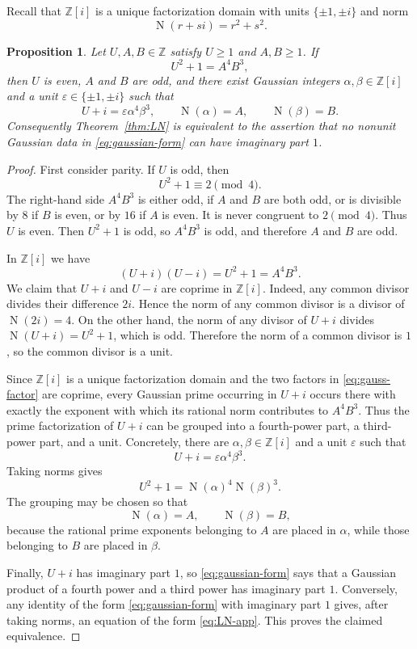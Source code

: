 \documentclass[a4paper,11pt]{amsart}
\newtheorem{proposition}[theorem]{Proposition}
\theoremstyle{remark}
\DeclareMathOperator{\Norm}{N}
\newcommand{\Z}{\mathbb Z}
\newcommand{\Zi}{\mathbb Z[i]}
\begin{document}
Recall that $\Zi$ is a unique factorization domain with units
$\{\pm1,\pm i\}$ and norm
\[
        \Norm(r+si)=r^2+s^2.
\]

\begin{proposition}\label{prop:gaussian-reformulation}
Let $U,A,B\in\Z$ satisfy $U\geq1$ and $A,B\geq1$.  If
\[
        U^2+1=A^4B^3,                         \tag{A.1}\label{eq:LN-app}
\]
then $U$ is even, $A$ and $B$ are odd, and there exist Gaussian integers
$\alpha,\beta\in\Zi$ and a unit $\varepsilon\in\{\pm1,\pm i\}$ such that
\[
        U+i=\varepsilon\alpha^4\beta^3,
        \qquad \Norm(\alpha)=A,
        \qquad \Norm(\beta)=B.                \tag{A.2}\label{eq:gaussian-form}
\]
Consequently Theorem~\ref{thm:LN} is equivalent to the assertion that no
nonunit Gaussian data in \eqref{eq:gaussian-form} can have imaginary part
$1$.
\end{proposition}

\begin{proof}
First consider parity.  If $U$ is odd, then
\[
        U^2+1\equiv 2\pmod 4.
\]
The right-hand side $A^4B^3$ is either odd, if $A$ and $B$ are both odd, or
is divisible by $8$ if $B$ is even, or by $16$ if $A$ is even.  It is never
congruent to $2\pmod4$.  Thus $U$ is even.  Then $U^2+1$ is odd, so
$A^4B^3$ is odd, and therefore $A$ and $B$ are odd.

In $\Zi$ we have
\[
        (U+i)(U-i)=U^2+1=A^4B^3.              \tag{A.3}\label{eq:gauss-factor}
\]
We claim that $U+i$ and $U-i$ are coprime in $\Zi$.  Indeed, any common
divisor divides their difference $2i$.  Hence the norm of any common divisor
is a divisor of $\Norm(2i)=4$.  On the other hand, the norm of any divisor of
$U+i$ divides $\Norm(U+i)=U^2+1$, which is odd.  Therefore the norm of a
common divisor is $1$, so the common divisor is a unit.

Since $\Zi$ is a unique factorization domain and the two factors in
\eqref{eq:gauss-factor} are coprime, every Gaussian prime occurring in
$U+i$ occurs there with exactly the exponent with which its rational norm
contributes to $A^4B^3$.  Thus the prime factorization of $U+i$ can be grouped
into a fourth-power part, a third-power part, and a unit.  Concretely, there
are $\alpha,\beta\in\Zi$ and a unit $\varepsilon$ such that
\[
        U+i=\varepsilon\alpha^4\beta^3.
\]
Taking norms gives
\[
        U^2+1=\Norm(\alpha)^4\Norm(\beta)^3.
\]
The grouping may be chosen so that
\[
        \Norm(\alpha)=A,
        \qquad
        \Norm(\beta)=B,
\]
because the rational prime exponents belonging to $A$ are placed in
$\alpha$, while those belonging to $B$ are placed in $\beta$.

Finally, $U+i$ has imaginary part $1$, so \eqref{eq:gaussian-form} says that
a Gaussian product of a fourth power and a third power has imaginary part
$1$.  Conversely, any identity of the form \eqref{eq:gaussian-form} with
imaginary part $1$ gives, after taking norms, an equation of the form
\eqref{eq:LN-app}.  This proves the claimed equivalence.
\end{proof}
\end{document}
